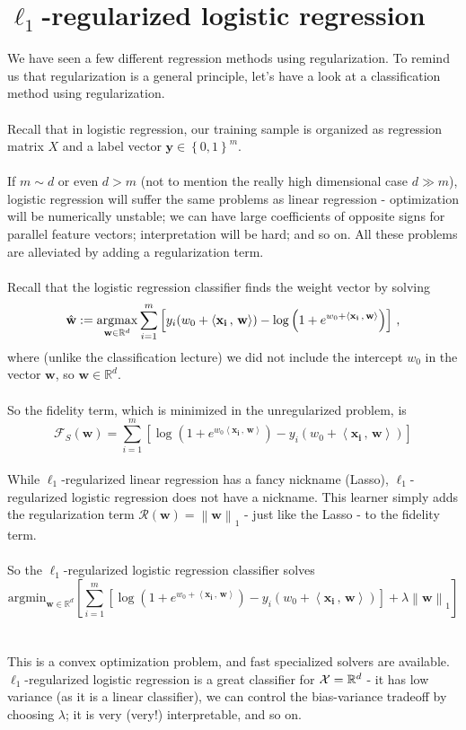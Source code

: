 \documentclass[11pt]{article}
\newcommand{\norm}[1]{\left\| #1\right\|}
\newcommand{\R}{\ensuremath{\mathbb{R}}}
\newcommand{\Rc}{\mathcal{R}}
\newcommand{\Fc}{\mathcal{F}}
\newcommand{\innerr}[2]{{\left\langle #1\,,\,#2 \right\rangle}}
\newcommand{\V}[1]{\mathbf{#1}}
\newcommand{\VV}[1]{\mathbf{#1}}
\begin{document}
\section{$\ell_1$-regularized logistic regression}

We have seen a few different regression methods using regularization. To remind
us that regularization is a general principle, let's have a look at a
classification method using regularization. 
\\~\\
Recall that in logistic regression, our training sample 
is organized as regression matrix $X$ and a
label vector $\V{y}\in\left\{ 0,1 \right\}^m$.
\\~\\
If $m\sim d$ or even $d>m$ (not to mention the really high dimensional case
$d\gg m$), logistic regression will  suffer the same problems as linear
regression -  optimization will be numerically unstable; we can have large
coefficients of opposite signs for parallel feature vectors; interpretation will
be hard; and so on. All these problems are alleviated by adding a regularization
term. 
\\~\\
Recall that the logistic regression classifier finds the weight vector by solving
 \[
      \hat{\VV{w}} := 
      \argmax_{\VV{w}\in\reals^{d}}  
      \sum_{i=1}^m \left[ y_i (w_0+\innerr{\VV{x_i}}{\VV{w}}) - \log
      \left(1+e^{w_0+\innerr{\VV{x_i}}{\VV{w}}}\right) \right]\,,
    \]
    where (unlike the classification lecture)
    we did not include the intercept $w_0$ in the vector $\V{w}$, so
    $\V{w}\in\R^d$.
\\~\\
    So the fidelity term, which is minimized in the unregularized problem, is  
    \[
      \Fc_S(\V{w}) = 
       \sum_{i=1}^m \left[\log
      \left(1+e^{w_0\innerr{\VV{x_i}}{\VV{w}}}\right) 
-
        y_i (w_0+\innerr{\VV{x_i}}{\VV{w}})  \right]   \]
~\\
      While $\ell_1$-regularized linear regression has a fancy nickname (Lasso),
      $\ell_1$-regularized logistic regression does not have a nickname. 
      This learner simply adds the regularization term
      $\Rc(\V{w})=\norm{\V{w}}_1$ - just like the Lasso - to the fidelity term. 
      \\~\\
      So the $\ell_1$-regularized logistic regression classifier solves
      \[
        \text{argmin}_{\V{w}\in\R^d}
        \left[
        \sum_{i=1}^m \left[\log
      \left(1+e^{w_0+\innerr{\VV{x_i}}{\VV{w}}}\right) 
-
        y_i (w_0+\innerr{\VV{x_i}}{\VV{w}})  \right]  + \lambda\norm{\V{w}}_1\right] \]
      \\~\\
      This is a convex optimization problem, and fast 
      specialized solvers are
      available. $\ell_1$-regularized logistic regression is a great classifier
      for $\X=\R^d$ - it has low variance (as it is a linear classifier), we can
      control the bias-variance tradeoff by choosing $\lambda$; it is very
      (very!) interpretable, and so on.
\end{document}
